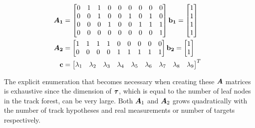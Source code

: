 \begin{equation}
\begin{split}
\bm{A_1} &=\begin{bmatrix}
		0 & 1 & 1 & 0 & 0 & 0 & 0 & 0 & 0 \\
       	0 & 0 & 1 & 0 & 0 & 1 & 0 & 1 & 0 \\
       	0 & 0 & 0 & 1 & 0 & 0 & 1 & 1 & 1 \\
       	0 & 0 & 0 & 0 & 0 & 0 & 0 & 0 & 1 \\
     	\end{bmatrix}
\boldsymbol{\mathbf{b_1}} = 	\begin{bmatrix}
			1 \\ 1  \\ 1 \\ 1
			\end{bmatrix} \\
\bm{A_2} &=\begin{bmatrix}
		1 & 1 & 1 & 1 & 0 & 0 & 0 & 0 & 0 \\
       	0 & 0 & 0 & 0 & 1 & 1 & 1 & 1 & 1 \\
     	\end{bmatrix} 
\boldsymbol{\mathbf{b_2}} = 	\begin{bmatrix}
			1 \\ 1
			\end{bmatrix} \\
\boldsymbol{\mathbf{c}} &=\begin{bmatrix}
		\lambda_1 & \lambda_2 & \lambda_3 & \lambda_4 & \lambda_5 & \lambda_6 & \lambda_7 & \lambda_8 & \lambda_9
		\end{bmatrix}^T \\
\end{split}
\label{eq:example_matrices}
\end{equation}

The explicit enumeration that becomes necessary when creating these $\bm{A}$ matrices is exhaustive since the dimension of $\boldsymbol{\mathbf{\tau}}$, which is equal to the number of leaf nodes in the track forest, can be very large. Both $\bm{A}_1$ and $\bm{A}_2$ grows quadratically with the number of track hypotheses and real measurements or number of targets respectively.

